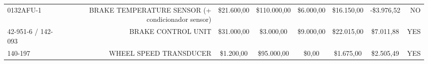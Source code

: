 \begin{table}[htbp]
\begin{tabular}{rrccrrcr}
    \multicolumn{1}{l}{0132AFU-1} & BRAKE TEMPERATURE SENSOR (+ condicionador sensor) & \$21.600,00 & \$110.000,00 & \multicolumn{1}{c}{\$6.000,00} & \multicolumn{1}{c}{\$16.150,00} & -\$3.976,52 & NO \\
    \multicolumn{1}{l}{42-951-6 / 142-093} & BRAKE CONTROL UNIT & \$31.000,00 & \$3.000,00 & \multicolumn{1}{c}{\$9.000,00} & \multicolumn{1}{c}{\$22.015,00} & \$7.011,88 & YES \\
    \multicolumn{1}{l}{140-197} & WHEEL SPEED TRANSDUCER  & \$1.200,00 & \$95.000,00 & \multicolumn{1}{c}{\$0,00} & \multicolumn{1}{c}{\$1.675,00} & \$2.505,49 & YES \\
    \bottomrule
    \end{tabular}%
  \label{tab:costs2}%
\end{table}%

